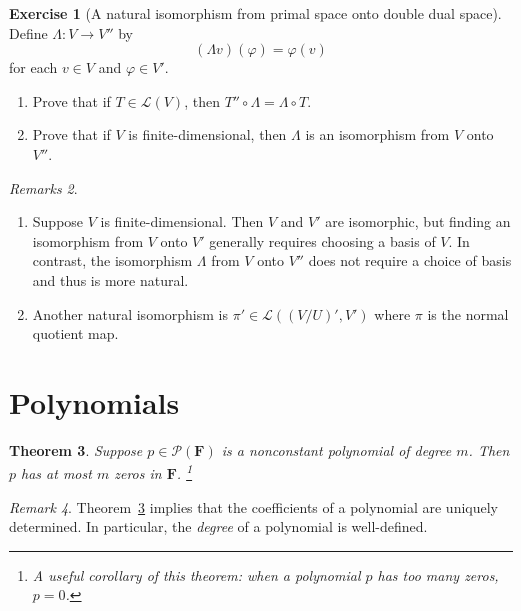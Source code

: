 \documentclass[nofonts,colorlinks]{tufte-handout}
\theoremstyle{plain} %
\newtheorem{thm}{Theorem}
\theoremstyle{definition}
\newtheorem{exer}[thm]{Exercise}
\theoremstyle{remark}
\newtheorem{rmk}[thm]{Remark}
\newtheorem{rmks}[thm]{Remarks}
\newcommand{\bra}[1]{\mathopen{}\left(#1\right)}
\renewcommand{\phi}{\varphi}
\newcommand{\F}{\mathbf{F}}
\renewcommand{\L}{\mathcal{L}}
\renewcommand{\P}{\mathcal{P}}
\begin{document}
\begin{exer}[A natural isomorphism from primal space onto double dual space]
	Define $\Lambda:V\to V''$ by
	\[(\Lambda v)(\phi)=\phi(v)\]
	for each $v\in V$ and $\phi\in V'$.
	\begin{enumerate}
		\item Prove that if $T\in\L(V)$, then $T''\circ\Lambda=\Lambda\circ T$.
		\item Prove that if $V$ is finite-dimensional, then $\Lambda$ is an isomorphism from $V$ onto $V''$.
	\end{enumerate}
\end{exer}

\begin{rmks}
	\begin{enumerate}
		\item Suppose $V$ is finite-dimensional. Then $V$ and $V'$ are isomorphic, but finding an isomorphism from $V$ onto $V'$ generally requires choosing a basis of $V$. In contrast, the isomorphism $\Lambda$ from $V$ onto $V''$ does not require a choice of basis and thus is more natural.
		\item Another natural isomorphism is $\pi'\in\L\bra{(V/U)',V'}$ where $\pi$ is the normal quotient map.
	\end{enumerate}
\end{rmks}


\section{Polynomials}
\begin{thm}\label{thm: limited number of zeros of polynomials}
	Suppose $p\in\P(\F)$ is a nonconstant polynomial of degree $m$. Then $p$ has at most $m$ zeros in $\F$.%
	\footnote{A useful corollary of this theorem: when a polynomial $p$ has too many zeros, $p=0$.}
\end{thm}

\begin{rmk}
	Theorem~\ref{thm: limited number of zeros of polynomials} implies that the coefficients of a polynomial are uniquely determined. In particular, the \emph{degree} of a polynomial is well-defined.
\end{rmk}
\end{document}
